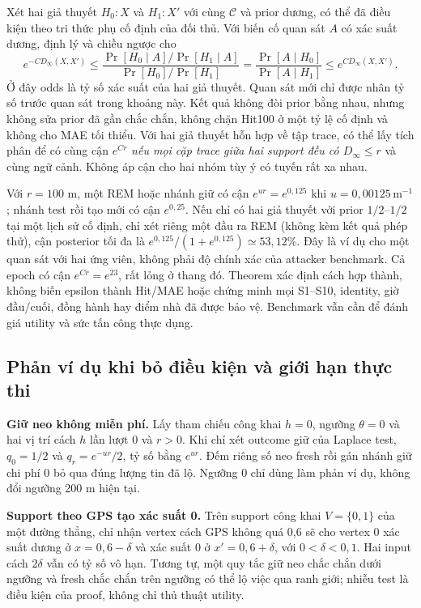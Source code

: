 Xét hai giả thuyết $H_0:X$ và $H_1:X'$ với cùng $\mathcal C$ và prior dương,
có thể đã điều kiện theo tri thức phụ cố định của đối thủ. Với biến cố
quan sát $A$ có xác suất dương, định lý và chiều ngược cho
\begin{equation}
 e^{-CD_\infty(X,X')}
 \leq
 \frac{\Pr[H_0\mid A]/\Pr[H_1\mid A]}
      {\Pr[H_0]/\Pr[H_1]}
 =\frac{\Pr[A\mid H_0]}{\Pr[A\mid H_1]}
 \leq e^{CD_\infty(X,X')}.
 \label{eq:formal-posterior-odds}
\end{equation}
Ở đây odds là tỷ số xác suất của hai giả thuyết. Quan sát mới chỉ được nhân tỷ số trước quan sát trong khoảng này. Kết quả
không đòi prior bằng nhau, nhưng không sửa prior đã gần chắc chắn, không
chặn Hit100 ở một tỷ lệ cố định và không cho MAE tối thiểu. Với hai giả
thuyết hỗn hợp về tập trace, có thể lấy tích phân để có cùng cận $e^{Cr}$
\emph{nếu mọi cặp trace giữa hai support đều có $D_\infty\leq r$} và cùng
ngữ cảnh. Không áp cận cho hai nhóm tùy ý có tuyến rất xa nhau.

Với $r=100$ m, một REM hoặc nhánh giữ có cận $e^{ur}=e^{0{,}125}$ khi
$u=0{,}00125\,\mathrm m^{-1}$; nhánh test rồi tạo mới có cận $e^{0{,}25}$.
Nếu chỉ có hai giả thuyết với prior $1/2$--$1/2$ tại một lịch sử cố định, chỉ xét riêng một đầu ra REM (không kèm kết quả phép thử), cận posterior tối đa là $e^{0{,}125}/(1+e^{0{,}125})\simeq53{,}12\%$. Đây là ví dụ cho một quan sát với hai ứng viên, không phải độ chính xác của attacker benchmark. Cả epoch có cận $e^{Cr}=e^{23}$, rất lỏng ở thang đó. Theorem xác định cách
hợp thành, không biến epsilon thành Hit/MAE hoặc chứng minh mọi S1--S10,
identity, giờ đầu/cuối, đồng hành hay điểm nhà đã được bảo vệ. Benchmark
vẫn cần để đánh giá utility và sức tấn công thực dụng.

\subsection{Phản ví dụ khi bỏ điều kiện và giới hạn thực thi}
\label{sec:formal-counterexamples}

\textbf{Giữ neo không miễn phí.} Lấy tham chiếu công khai $h=0$, ngưỡng
$\theta=0$ và hai vị trí cách $h$ lần lượt 0 và $r>0$. Khi chỉ xét outcome
giữ của Laplace test, $q_0=1/2$ và $q_r=e^{-ur}/2$, tỷ số bằng $e^{ur}$.
Đếm riêng số neo fresh rồi gán nhánh giữ chi phí 0 bỏ qua đúng lượng tin
đã lộ. Ngưỡng 0 chỉ dùng làm phản ví dụ, không đổi ngưỡng 200 m hiện tại.

\textbf{Support theo GPS tạo xác suất 0.} Trên support công khai
$V=\{0,1\}$ của một đường thẳng, chỉ nhận vertex cách GPS không quá 0,6
sẽ cho vertex 0 xác suất dương ở $x=0{,}6-\delta$ và xác suất 0 ở
$x'=0{,}6+\delta$, với $0<\delta<0{,}1$. Hai input cách $2\delta$ vẫn có
tỷ số vô hạn. Tương tự, một quy tắc giữ neo chắc chắn dưới ngưỡng và fresh
chắc chắn trên ngưỡng có thể lộ việc qua ranh giới; nhiễu test là điều kiện
của proof, không chỉ thủ thuật utility.

